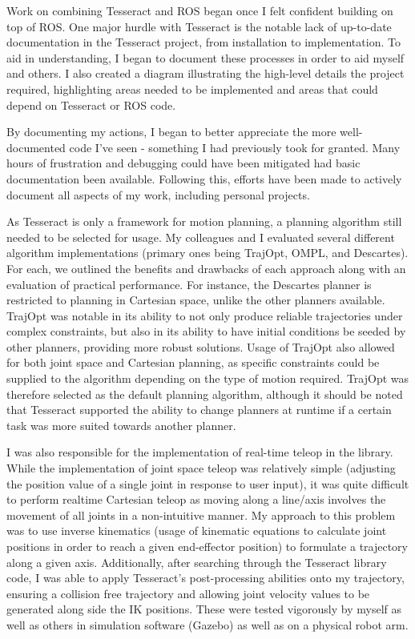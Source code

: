 Work on combining Tesseract and ROS began once I felt confident building on top of ROS. One major
hurdle with Tesseract is the notable lack of up-to-date documentation in the Tesseract project, from
installation to implementation. To aid in understanding, I began to document these processes in
order to aid myself and others. I also created a diagram illustrating the high-level details the
project required, highlighting areas needed to be implemented and areas that could depend on
Tesseract or ROS code.

By documenting my actions, I began to better appreciate the more well-documented code I've seen -
something I had previously took for granted. Many hours of frustration and debugging could have been
mitigated had basic documentation been available. Following this, efforts have been made to actively
document all aspects of my work, including personal projects.

As Tesseract is only a framework for motion planning, a planning algorithm still needed to be
selected for usage. My colleagues and I evaluated several different algorithm implementations
(primary ones being TrajOpt, OMPL, and Descartes). For each, we outlined the benefits and drawbacks
of each approach along with an evaluation of practical performance. For instance, the Descartes
planner is restricted to planning in Cartesian space, unlike the other planners available. TrajOpt
was notable in its ability to not only produce reliable trajectories under complex constraints, but
also in its ability to have initial conditions be seeded by other planners, providing more robust
solutions. Usage of TrajOpt also allowed for both joint space and Cartesian planning, as specific
constraints could be supplied to the algorithm depending on the type of motion required. TrajOpt was
therefore selected as the default planning algorithm, although it should be noted that Tesseract
supported the ability to change planners at runtime if a certain task was more suited towards
another planner.

I was also responsible for the implementation of real-time teleop in the library. While the
implementation of joint space teleop was relatively simple (adjusting the position value of a single
joint in response to user input), it was quite difficult to perform realtime Cartesian teleop as
moving along a line/axis involves the movement of all joints in a non-intuitive manner. My approach
to this problem was to use inverse kinematics (usage of kinematic equations to calculate joint
positions in order to reach a given end-effector position) to formulate a trajectory along a given
axis. Additionally, after searching through the Tesseract library code, I was able to apply
Tesseract's post-processing abilities onto my trajectory, ensuring a collision free trajectory and
allowing joint velocity values to be generated along side the IK positions. These were tested
vigorously by myself as well as others in simulation software (Gazebo) as well as on a physical
robot arm.

